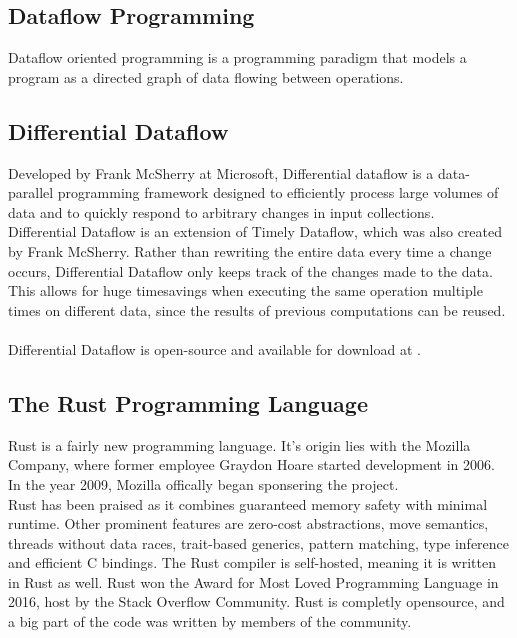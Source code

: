 \documentclass[11pt,singlecolumn]{scrartcl}
\begin{document}
\subsection{Dataflow Programming}
Dataflow oriented programming is a programming paradigm that models a program as a directed graph of data flowing between operations.

\clearpage

\subsection{Differential Dataflow}

Developed by Frank McSherry at Microsoft, Differential dataflow is a data-parallel programming framework designed to efficiently process large volumes of data and to quickly respond to arbitrary changes in input collections.\cite{Differential}\\
Differential Dataflow is an extension of Timely Dataflow, which was also created by Frank McSherry. \cite{GitTimely}
Rather than rewriting the entire data every time a change occurs, Differential Dataflow only keeps track of the changes made to the data. This allows for huge timesavings when executing the same operation multiple times on different data, since the results of previous computations can be reused.\\\\
Differential Dataflow is open-source and available for download at \cite{GitDiff}.
\clearpage

\subsection{The Rust Programming Language}
Rust is a fairly new programming language. It's origin lies with the Mozilla Company, where former employee Graydon Hoare started development in 2006. In the year 2009, Mozilla offically began sponsering the project.\\
Rust has been praised as it combines guaranteed memory safety with minimal runtime. Other prominent features are zero-cost abstractions, move semantics, threads without data races, trait-based generics, pattern matching, type inference and efficient C bindings\cite{RustLang}. The Rust compiler is self-hosted, meaning it is written in Rust as well. Rust won the Award for Most Loved Programming Language in 2016, host by the Stack Overflow Community.
Rust is completly opensource, and a big part of the code was written by members of the community.
\clearpage
\end{document}
